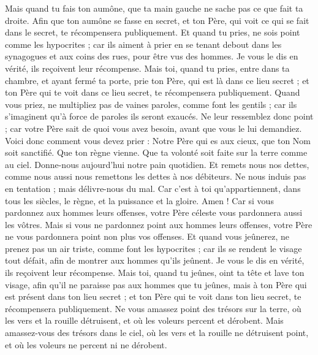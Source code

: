 \begin{multicols}{2}
Mais quand tu fais ton aumône, que ta main gauche ne sache pas ce que fait ta droite.
Afin que ton aumône se fasse en secret, et ton Père, qui voit ce qui se fait dans le secret, te récompensera publiquement.
Et quand tu pries, ne sois point comme les hypocrites ; car ils aiment à prier en se tenant debout dans les synagogues et aux coins des rues, pour être vus des hommes. Je vous le dis en vérité, ils reçoivent leur récompense.
Mais toi, quand tu pries, entre dans ta chambre, et ayant fermé ta porte, prie ton Père, qui est là dans ce lieu secret ; et ton Père qui te voit dans ce lieu secret, te récompensera publiquement.
Quand vous priez, ne multipliez pas de vaines paroles, comme font les gentils ; car ils s'imaginent qu’à force de paroles ils seront exaucés.
Ne leur ressemblez donc point ; car votre Père sait de quoi vous avez besoin, avant que vous le lui demandiez.
Voici donc comment vous devez prier : Notre Père qui es aux cieux, que ton Nom soit sanctifié.
Que ton règne vienne. Que ta volonté soit faite sur la terre comme au ciel.
Donne-nous aujourd'hui notre pain quotidien.
Et remets nous nos dettes, comme nous aussi nous remettons les dettes à nos débiteurs.
Ne nous induis pas en tentation ; mais délivre-nous du mal. Car c’est à toi qu’appartiennent, dans tous les siècles, le règne, et la puissance et la gloire. Amen !
Car si vous pardonnez aux hommes leurs offenses, votre Père céleste vous pardonnera aussi les vôtres.
Mais si vous ne pardonnez point aux hommes leurs offenses, votre Père ne vous pardonnera point non plus vos offenses.
Et quand vous jeûnerez, ne prenez pas un air triste, comme font les hypocrites ; car ils se rendent le visage tout défait, afin de montrer aux hommes qu'ils jeûnent. Je vous le dis en vérité, ils reçoivent leur récompense.
Mais toi, quand tu jeûnes, oint ta tête et lave ton visage,
afin qu'il ne paraisse pas aux hommes que tu jeûnes, mais à ton Père qui est présent dans ton lieu secret ; et ton Père qui te voit dans ton lieu secret, te récompensera publiquement.
Ne vous amassez point des trésors sur la terre, où les vers et la rouille détruisent, et où les voleurs percent et dérobent.
Mais amassez-vous des trésors dans le ciel, où les vers et la rouille ne détruisent point, et où les voleurs ne percent ni ne dérobent.

\end{multicols}
